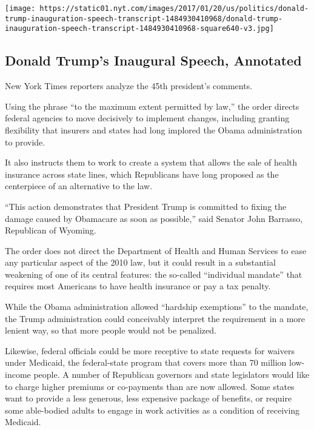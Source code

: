 \href{https://www.nytimes.com/interactive/2017/01/20/us/politics/donald-trump-inauguration-speech-transcript.html}{}

\texttt{[image: https://static01.nyt.com/images/2017/01/20/us/politics/donald-trump-inauguration-speech-transcript-1484930410968/donald-trump-inauguration-speech-transcript-1484930410968-square640-v3.jpg]}

\hypertarget{donald-trumps-inaugural-speech-annotated}{%
\subsection{Donald Trump's Inaugural Speech,
Annotated}\label{donald-trumps-inaugural-speech-annotated}}

New York Times reporters analyze the 45th president's comments.

Using the phrase ``to the maximum extent permitted by law,'' the order
directs federal agencies to move decisively to implement changes,
including granting flexibility that insurers and states had long
implored the Obama administration to provide.

It also instructs them to work to create a system that allows the sale
of health insurance across state lines, which Republicans have long
proposed as the centerpiece of an alternative to the law.

``This action demonstrates that President Trump is committed to fixing
the damage caused by Obamacare as soon as possible,'' said Senator John
Barrasso, Republican of Wyoming.

The order does not direct the Department of Health and Human Services to
ease any particular aspect of the 2010 law, but it could result in a
substantial weakening of one of its central features: the so-called
``individual mandate'' that requires most Americans to have health
insurance or pay a tax penalty.

While the Obama administration allowed ``hardship exemptions'' to the
mandate, the Trump administration could conceivably interpret the
requirement in a more lenient way, so that more people would not be
penalized.

Likewise, federal officials could be more receptive to state requests
for waivers under Medicaid, the federal-state program that covers more
than 70 million low-income people. A number of Republican governors and
state legislators would like to charge higher premiums or co-payments
than are now allowed. Some states want to provide a less generous, less
expensive package of benefits, or require some able-bodied adults to
engage in work activities as a condition of receiving Medicaid.

